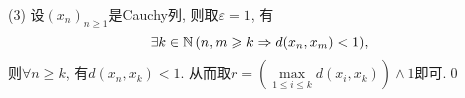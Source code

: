 \begin{appendix}
\begin{Proof}
	(3) 设$ (x_n)_{n\geqslant 1} $是Cauchy列, 则取$ \varepsilon=1 $, 有
	\[
	\exists k\in\mathbb{N}\,(n,m\geqslant k\Rightarrow d(x_n,x_m)<1),
	\]
	则$ \forall n\geqslant k $, 有$ d(x_n,x_k)<1 $. 从而取$ r=\left(\max\limits_{1\leqslant i\leqslant k}d(x_i,x_k)\right)\land 1 $即可.\qed
	\end{Proof}
	
	
	
	
\end{appendix}
	
	
	
	
	
